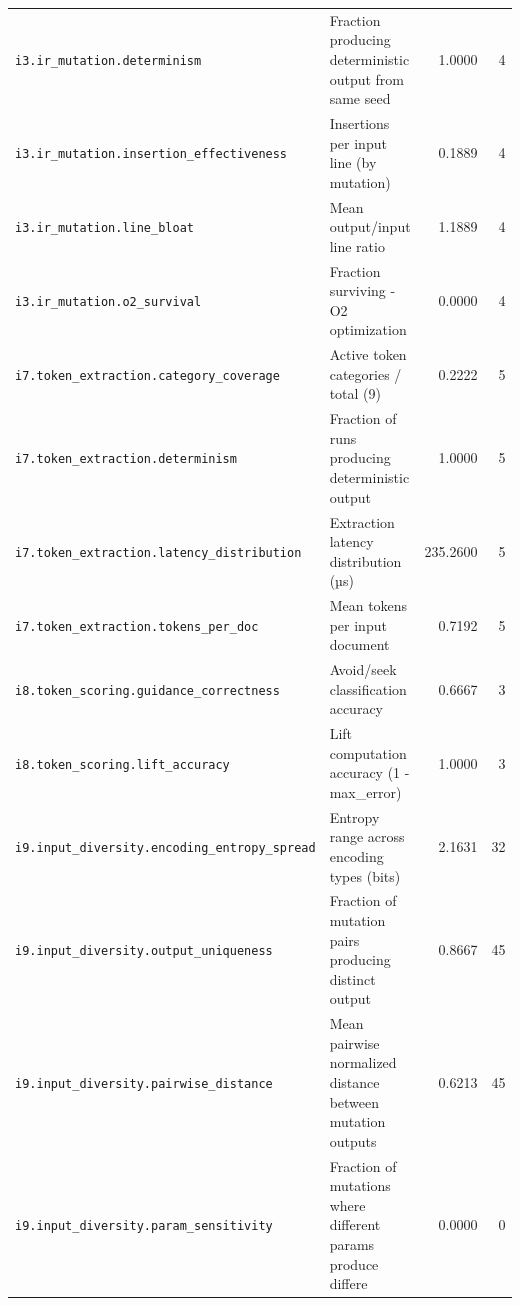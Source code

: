\begin{table}[htbp]
\begin{tabular}{llrr}
\midrule
\texttt{i3.ir\_mutation.determinism} & Fraction producing deterministic output from same seed & 1.0000 & 4 \\
\texttt{i3.ir\_mutation.insertion\_effectiveness} & Insertions per input line (by mutation) & 0.1889 & 4 \\
\texttt{i3.ir\_mutation.line\_bloat} & Mean output/input line ratio & 1.1889 & 4 \\
\texttt{i3.ir\_mutation.o2\_survival} & Fraction surviving -O2 optimization & 0.0000 & 4 \\
\midrule
\texttt{i7.token\_extraction.category\_coverage} & Active token categories / total (9) & 0.2222 & 5 \\
\texttt{i7.token\_extraction.determinism} & Fraction of runs producing deterministic output & 1.0000 & 5 \\
\texttt{i7.token\_extraction.latency\_distribution} & Extraction latency distribution (µs) & 235.2600 & 5 \\
\texttt{i7.token\_extraction.tokens\_per\_doc} & Mean tokens per input document & 0.7192 & 5 \\
\midrule
\texttt{i8.token\_scoring.guidance\_correctness} & Avoid/seek classification accuracy & 0.6667 & 3 \\
\texttt{i8.token\_scoring.lift\_accuracy} & Lift computation accuracy (1 - max\_error) & 1.0000 & 3 \\
\midrule
\texttt{i9.input\_diversity.encoding\_entropy\_spread} & Entropy range across encoding types (bits) & 2.1631 & 32 \\
\texttt{i9.input\_diversity.output\_uniqueness} & Fraction of mutation pairs producing distinct output & 0.8667 & 45 \\
\texttt{i9.input\_diversity.pairwise\_distance} & Mean pairwise normalized distance between mutation outputs & 0.6213 & 45 \\
\texttt{i9.input\_diversity.param\_sensitivity} & Fraction of mutations where different params produce differe & 0.0000 & 0 \\
\bottomrule
\end{tabular}
\end{table}
